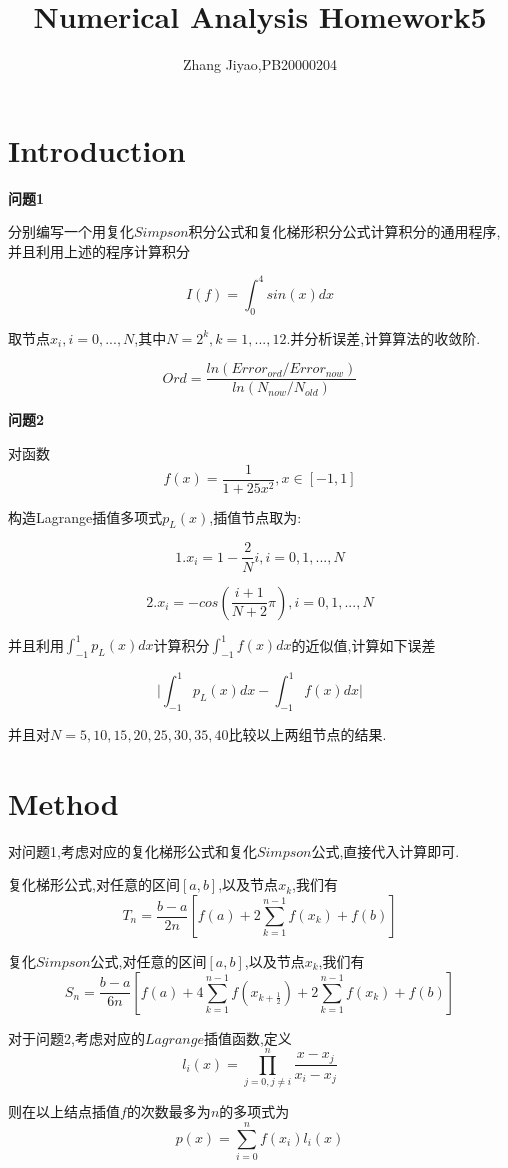 \documentclass{article}
\title{Numerical Analysis Homework5}
\author{Zhang Jiyao,PB20000204}
\begin{document}
	\maketitle
	
	\section{Introduction}
	
	\textbf{问题1}
	
	分别编写一个用复化$Simpson$积分公式和复化梯形积分公式计算积分的通用程序,并且利用上述的程序计算积分
	
	$$I(f)=\int_{0}^{4}sin(x)dx$$
	
	取节点$x_i,i=0,...,N$,其中$N=2^k,k=1,...,12$.并分析误差,计算算法的收敛阶.
	
	$$Ord=\frac{ln(Error_{ord}/Error_{now})}{ln(N_{now}/N_{old})}$$
	
	\textbf{问题2}
	
	对函数
	$$ f(x)=\frac{1}{1+25x^2},x\in [-1,1]$$
	
	构造Lagrange插值多项式$p_L(x)$,插值节点取为:
	
	$$1.x_i=1-\frac{2}{N}i,i=0,1,...,N$$
	
	$$2.x_i=-cos(\frac{i+1}{N+2}\pi),i=0,1,...,N$$
	
	并且利用$\int_{-1}^{1}p_{L}(x)dx$计算积分$\int_{-1}^{1}f(x)dx$的近似值,计算如下误差
	
	$$\vert \int_{-1}^{1}p_{L}(x)dx - \int_{-1}^{1}f(x)dx \vert$$
	
	并且对$N=5,10,15,20,25,30,35,40$比较以上两组节点的结果.
	

	\section{Method}
	
	对问题1,考虑对应的复化梯形公式和复化$Simpson$公式,直接代入计算即可.
	
	复化梯形公式,对任意的区间$[a,b]$,以及节点${x_k}$,我们有
	$$ T_n = \frac{b-a}{2n}[f(a)+2\sum_{k=1}^{n-1}f(x_k)+f(b)]$$
	
	复化$Simpson$公式,对任意的区间$[a,b]$,以及节点${x_k}$,我们有
	$$ S_n = \frac{b-a}{6n}[f(a)+4\sum_{k=1}^{n-1}f(x_{k+\frac{1}{2}}) +2\sum_{k=1}^{n-1}f(x_k)+f(b)]$$
	
	对于问题2,考虑对应的$Lagrange$插值函数,定义
	$$ l_{i}(x)=\prod_{j=0,j\ne i}^{n}  \frac{x-x_j}{x_i-x_j} $$
	
	则在以上结点插值$f$的次数最多为$n$的多项式为
	$$ p(x)=\sum_{i=0}^{n}f(x_i)l_i(x)$$
	
\end{document}
